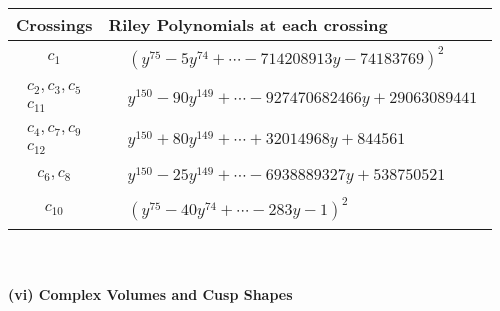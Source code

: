 \documentclass[1p]{elsarticle_modified}
\theoremstyle{definition}
\begin{document}
\begin{tabular}{m{50pt}|m{274pt}}
Crossings & \hspace{64pt}Riley Polynomials at each crossing \\
\hline $$\begin{aligned}c_{1}\end{aligned}$$&$\begin{aligned}
&(y^{75}-5 y^{74}+\cdots-714208913 y-74183769)^{2}
\end{aligned}$\\
\hline $$\begin{aligned}c_{2},c_{3},c_{5}\\c_{11}\end{aligned}$$&$\begin{aligned}
&y^{150}-90 y^{149}+\cdots-927470682466 y+29063089441
\end{aligned}$\\
\hline $$\begin{aligned}c_{4},c_{7},c_{9}\\c_{12}\end{aligned}$$&$\begin{aligned}
&y^{150}+80 y^{149}+\cdots+32014968 y+844561
\end{aligned}$\\
\hline $$\begin{aligned}c_{6},c_{8}\end{aligned}$$&$\begin{aligned}
&y^{150}-25 y^{149}+\cdots-6938889327 y+538750521
\end{aligned}$\\
\hline $$\begin{aligned}c_{10}\end{aligned}$$&$\begin{aligned}
&(y^{75}-40 y^{74}+\cdots-283 y-1)^{2}
\end{aligned}$\\
\hline
\end{tabular}\\~\\
\newpage\flushleft \textbf{(vi) Complex Volumes and Cusp Shapes}
\end{document}
